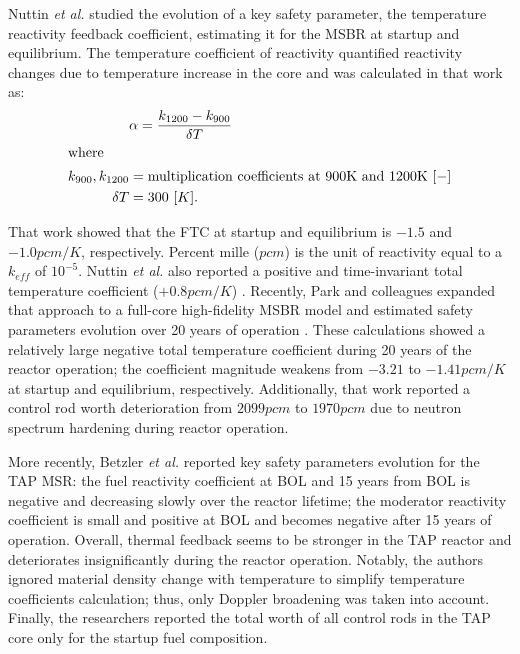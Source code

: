 Nuttin \emph{et al.} studied the evolution of a key safety parameter, the 
temperature reactivity feedback coefficient, estimating it for the \gls{MSBR} 
at startup and equilibrium. The temperature coefficient of reactivity 
quantified reactivity changes due to temperature increase in the core and was 
calculated in that work as:
\begin{align}\label{eq:feedback}
	& \alpha = \frac{k_{1200} - k_{900}}{\delta 
	T} \\
	\intertext{where}
	k_{900}, k_{1200}  &= \mbox{multiplication coefficients at 900K and 
		1200K $[-]$} \nonumber \\
	\delta T &= \mbox{300 $[K]$.}\nonumber
\end{align}

That work showed that the \gls{FTC} at startup and equilibrium is $-1.5$ 
and $-1.0pcm/K$, respectively. Percent mille ($pcm$) is the unit of 
reactivity equal to a $k_{eff}$ of $10^{-5}$. Nuttin \emph{et al.} also 
reported a positive and time-invariant total temperature coefficient 
($+0.8pcm/K$) \cite{nuttin_potential_2005}. Recently, Park and colleagues 
expanded that approach to a full-core high-fidelity \gls{MSBR} model and 
estimated safety parameters evolution over 20 years of operation 
\cite{park_whole_2015}. These calculations showed a relatively large negative 
total temperature coefficient during 20 years of the reactor operation; the 
coefficient magnitude weakens from $-3.21$ to $-1.41pcm/K$ at startup and 
equilibrium, respectively. Additionally, that work reported a control rod 
worth deterioration from $2099pcm$ to $1970pcm$ due to neutron spectrum 
hardening during reactor operation. 

More recently, Betzler \emph{et al.} \cite{betzler_assessment_2017-1} reported 
key safety parameters evolution for the \gls{TAP} \gls{MSR}: the fuel 
reactivity coefficient at \gls{BOL} and 15 years from \gls{BOL} is negative 
and decreasing slowly over the reactor lifetime; the moderator reactivity 
coefficient is small and positive at \gls{BOL} and becomes negative after 15 
years of operation. Overall, thermal feedback seems to be stronger in the 
\gls{TAP} reactor and deteriorates insignificantly during the reactor 
operation. Notably, the authors ignored material density change with 
temperature to simplify temperature coefficients calculation; thus, only  
Doppler broadening was taken into account. Finally, the researchers reported 
the total worth of all control rods in the \gls{TAP} core only for the startup 
fuel composition. 

